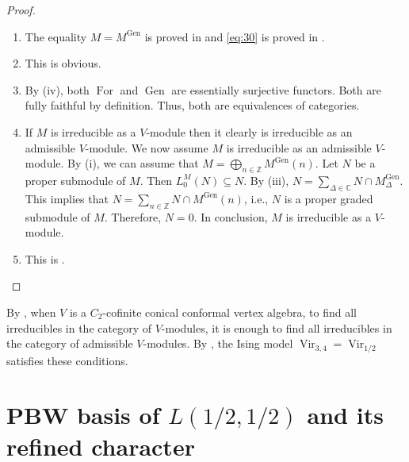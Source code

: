 \documentclass[a4paper, 12pt, reqno]{amsart}
\theoremstyle{remark}
\DeclareMathOperator{\Vir}{Vir}
\DeclareMathOperator{\For}{For}
\DeclareMathOperator{\Gen}{Gen}
\begin{document}
\begin{proof}\leavevmode
  \begin{enumerate}
  \item The equality $M = M^{\Gen}$ is proved in \cite[Proposition 5.7]{abe_rationality_2003} and \eqref{eq:30} is proved in \cite[Lemma 5.6]{abe_rationality_2003}.
  \item This is obvious.
  \item By (iv), both $\For$ and $\Gen$ are essentially surjective functors.
    Both are fully faithful by definition.
    Thus, both are equivalences of categories.
  \item If $M$ is irreducible as a $V$-module then it clearly is irreducible as an admissible $V$-module.
    We now assume $M$ is irreducible as an admissible $V$-module.
    By (i), we can assume that $M = \bigoplus_{n \in \mathbb{Z}}M^{\Gen}(n)$.
    Let $N$ be a proper submodule of $M$.
    Then $L_0^M(N) \subseteq N$.
    By (iii), $N = \sum_{\Delta \in \mathbb{C}}N \cap M^{\Gen}_{\Delta}$.
    This implies that $N = \sum_{n \in \mathbb{Z}}N \cap M^{\Gen}(n)$, i.e., $N$ is a proper graded submodule of $M$.
    Therefore, $N = 0$.
    In conclusion, $M$ is irreducible as a $V$-module.
  \item This is \cite[Corollary 5.8]{abe_rationality_2003}. \qedhere
  \end{enumerate}
\end{proof}

By , when $V$ is a $C_2$-cofinite conical conformal vertex algebra, to find all irreducibles in the category of $V$-modules, it is enough to find all irreducibles in the category of admissible $V$-modules.
By , the Ising model $\Vir_{3, 4} = \Vir_{1/2}$ satisfies these conditions.

\section{PBW basis of $L(1/2, 1/2)$ and its refined character}
\label{sec:pbw-basis-l12}
\end{document}
